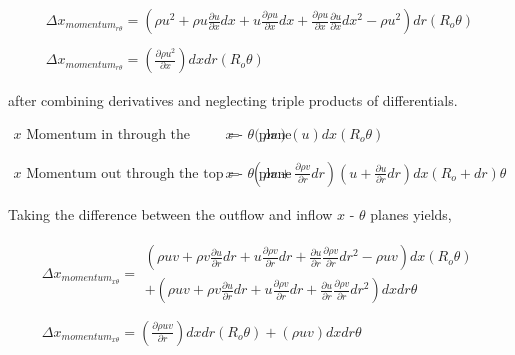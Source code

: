 \begin{displaymath}
	\begin{array}{c}
	\Delta x_{momentum_{r \theta}}=(\rho u^2 + \rho u \frac{\partial u}{\partial x}dx + 
	u \frac{\partial \rho u}{\partial x}dx +
	\frac{\partial\rho u}{\partial x} \frac{\partial u}{\partial x}dx^2 - \rho u^2)dr(R_o \theta) \\ \\
	\Delta x_{momentum_{r \theta}}=(\frac{\partial \rho u^2}{\partial x})dxdr(R_o \theta)
	\end{array}
\end{displaymath}

	after combining derivatives and neglecting triple products of differentials.

\begin{displaymath}
	\begin{array}{ccc}
		\textrm{$x$ Momentum in through the bottom $x$ - $\theta$ plane} &
		= & (\rho v)(u)dx(R_o \theta)\\
 		& \\ & \\
		\textrm{$x$ Momentum out through the top $x$ - $\theta$ plane} &
		= & (\rho v + \frac{\partial \rho v}{\partial r}dr)(u + \frac{\partial u}{\partial r}dr)dx
		(R_o + dr) \theta 
	\end{array}
\end{displaymath}

	Taking the difference between the outflow and inflow $x$ - $\theta$ planes yields,

\begin{displaymath}
	\begin{array}{c}
	\Delta x_{momentum_{x \theta}}=
		\begin{array}{c}
	(\rho uv + \rho v \frac{\partial u}{\partial r}dr + 
	u \frac{\partial \rho v}{\partial r}dr + \frac{\partial u}{\partial r} \frac{\partial \rho v}{\partial r}dr^2 -
	\rho uv)dx(R_o \theta) \\
	 + (\rho uv + \rho v \frac{\partial u}{\partial r}dr + u \frac{\partial \rho v}{\partial r}dr + 
	\frac{\partial u}{\partial r} \frac{\partial \rho v}{\partial r}dr^2)dxdr \theta
		\end{array} \\ \\
	\Delta x_{momentum_{x \theta}}= (\frac{\partial \rho uv}{\partial r})dxdr (R_o \theta) + (\rho uv)dxdr \theta
	\end{array}
\end{displaymath}

